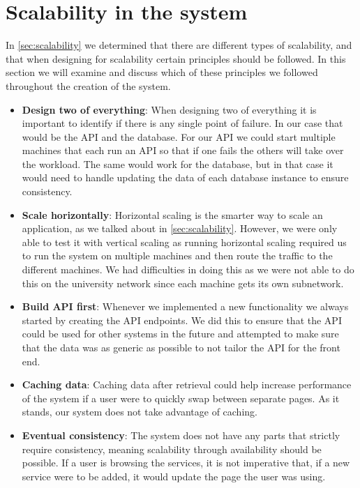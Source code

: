 \section{Scalability in the system}
In \autoref{sec:scalability} we determined that there are different types of scalability, and that when designing for scalability certain principles should be followed.
In this section we will examine and discuss which of these principles we followed throughout the creation of the system.

\begin{itemize}
    \item \textbf{Design two of everything}: When designing two of everything it is important to identify if there is any single point of failure.
    In our case that would be the API and the database.
    For our API we could start multiple machines that each run an API so that if one fails the others will take over the workload.
    The same would work for the database, but in that case it would need to handle updating the data of each database instance to ensure consistency.
    \item \textbf{Scale horizontally}: Horizontal scaling is the smarter way to scale an application, as we talked about in \autoref{sec:scalability}.
    However, we were only able to test it with vertical scaling as running horizontal scaling required us to run the system on multiple machines and then route the traffic to the different machines.
    We had difficulties in doing this as we were not able to do this on the university network since each machine gets its own subnetwork.
    \item \textbf{Build API first}: Whenever we implemented a new functionality we always started by creating the API endpoints.
    We did this to ensure that the API could be used for other systems in the future and attempted to make sure that the data was as generic as possible to not tailor the API for the front end. 
    \item \textbf{Caching data}: Caching data after retrieval could help increase performance of the system if a user were to quickly swap between separate pages. 
    As it stands, our system does not take advantage of caching.
    \item \textbf{Eventual consistency}: The system does not have any parts that strictly require consistency, meaning scalability through availability should be possible. 
    If a user is browsing the services, it is not imperative that, if a new service were to be added, it would update the page the user was using.

\end{itemize}
